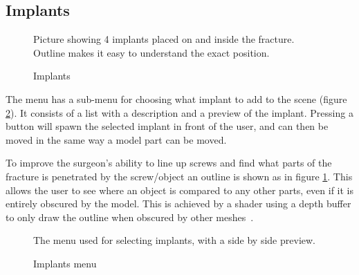 \documentclass[a4paper]{report}
\begin{document}
\subsection{Implants}

\begin{figure}[h!]
    \centering
	\hfill
	\caption{Implants}\label{implants}
  \small
  Picture showing 4 implants placed on and inside the fracture. Outline makes it easy to understand the exact position.
\end{figure}

The menu has a sub-menu for choosing what implant to add to the scene (figure \ref{implantsmenu}). It consists of a list with a description and a preview of the implant. Pressing a button will spawn the selected implant in front of the user, and can then be moved in the same way a model part can be moved.

To improve the surgeon's ability to line up screws and find what parts of the fracture is penetrated by the screw/object an outline is shown as in figure \ref{implants}. This allows the user to see where an object is compared to any other parts, even if it is entirely obscured by the model. This is achieved by a shader using a depth buffer to only draw the outline when obscured by other meshes~\cite{technologies_unity_nodate-1}.

\begin{figure}[h!]
    \centering
	\hfill
	\caption{Implants menu}\label{implantsmenu}
  \small
  The menu used for selecting implants, with a side by side preview.
\end{figure}
\end{document}
